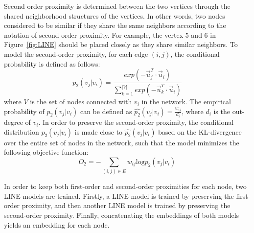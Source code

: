 \begin{itemize}
Second order proximity is determined between the two vertices through the shared neighborhood structures of the vertices. In other words, two nodes considered to be similar if they share the same neighbors according to the notation of second order proximity. For example, the vertex 5 and 6 in Figure~\ref{fig:LINE} should be placed closely as they share similar neighbors. 
To model the second-order proximity, for each edge $(i,j)$, the conditional probability is defined as follows: 
\begin{equation}
p_{2}(v_{j}|v_{i})=\frac{exp(-\vec{u}_{j}^{T}\cdot\vec{u}_{i})}{\sum\limits_{k=1}^{|V|} exp(-\vec{u}_{k}^{T}\cdot\vec{u}_{i})}
\end{equation}
where $V$ is the set of nodes connected with $v_i$ in the network. The empirical probability of $p_{2}(v_{j}|v_{i})$ can be defined as $\hat{p_2}(v_{j}|v_{i})=\frac{w_{ij}}{d_i}$, where $d_i$ is the out-degree of $v_i$. In order to preserve the second-order proximity, the conditional distribution $p_{2}(v_{j}|v_{i})$ is made close to $\hat{p_2}(v_{j}|v_{i})$ based on the KL-divergence over the entire set of nodes in the network, such that the model minimizes the following objective function:
\begin{equation}
O_{2}=-\sum_{(i,j) \in E}w_{ij} \textrm{log} p_{2}(v_{j}|v_{i})
\end{equation}

In order to keep both first-order and second-order proximities for each node, two LINE models are trained. Firstly, a LINE model is trained by preserving the first-order proximity, and then another LINE model is trained by preserving the second-order proximity. Finally, concatenating the embeddings of both models yields an embedding for each node. \\


\end{itemize}
